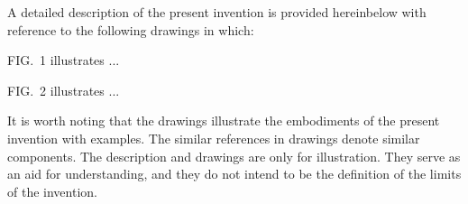 



A detailed description of the present invention is provided hereinbelow with reference to the following drawings in which:

FIG.~1 illustrates 
	...




FIG.~2 illustrates
	...








It is worth noting that the drawings illustrate the embodiments of the present invention with examples. 
The similar references in drawings denote similar components. 
The description and drawings are only for illustration. 
They serve as an aid for understanding, and they do not intend to be the definition of the limits of the invention.




